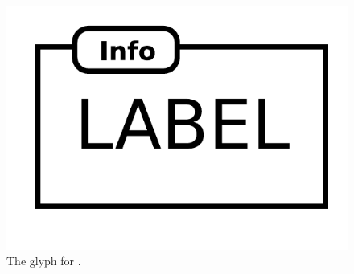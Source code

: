 \begin{figure}[H]
  \centering
  \includegraphics[scale = 0.5]{images/biologicalActivity}
  \caption{The \AF glyph for .}
  \label{fig:af:biologicalActivity}
\end{figure}
